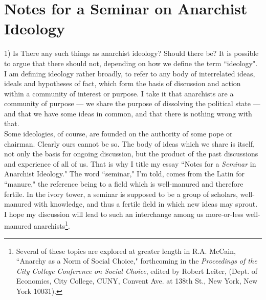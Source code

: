 \chapter{Notes for a Seminar on Anarchist Ideology}

1) Is There any such things as anarchist ideology? Should there be? It is possible to argue that there should not, depending on how we define the term ``ideology". I am defining ideology rather broadly, to refer to any body of interrelated ideas, ideals and hypotheses of fact, which form the basis of discussion and action within a community of interest or purpose. I take it that anarchists are a community of purpose --- we share the purpose of dissolving the political state --- and that we have some ideas in common, and that there is nothing wrong with that.\\
Some ideologies, of course, are founded on the authority of some pope or chairman. Clearly ours cannot be so. The body of ideas which we share is itself, not only the basis for ongoing discussion, but the product of the past discussions and experience of all of us. That is why I title my essay ``Notes for a \emph{Seminar} in Anarchist Ideology." The word ``seminar," I'm told, comes from the Latin for ``manure," the reference being to a field which is well-manured and therefore fertile. In the ivory tower, a seminar is supposed to be a group of scholars, well-manured with knowledge, and thus a fertile field in which new ideas may sprout. I hope my discussion will lead to such an interchange among us more-or-less well-manured anarchists\footnote{Several of these topics are explored at greater length in R.A. McCain, ``Anarchy as a Norm of Social Choice," forthcoming in the \emph{Proceedings of the City College Conference on Social Choice}, edited by Robert Leiter, (Dept. of Economics, City College, CUNY, Convent Ave. at 138th St., New York, New York 10031).}.\\

